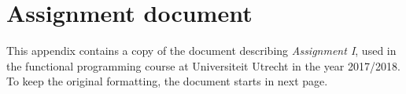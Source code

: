\chapter{Assignment document}
\label{app:assignment}

This appendix contains a copy of the document describing \emph{Assignment I}, used in the functional programming course at Universiteit Utrecht in the year 2017/2018. To keep the original formatting, the document starts in next page.


